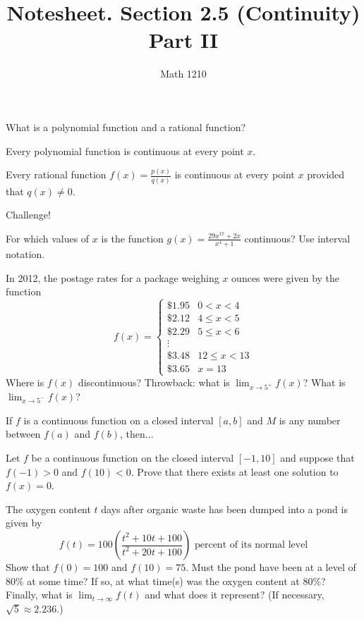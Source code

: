 \documentclass[12pt, a4paper]{article}
\author{Math 1210}
\title{Notesheet. Section 2.5 (Continuity) Part II}
\date{}
\begin{document}
\maketitle
\nameline
\begin{defi}
 What is a polynomial function and a rational function?
\end{defi}
\begin{thrm}
  \item Every polynomial function is continuous at every point $x$.
  \item Every rational function $f(x) = \frac{p(x)}{q(x)}$ is continuous at every point $x$ provided that $q(x) \neq 0$.

  \proof Challenge!
  \vs\vs\vs\vs\vs\vs\vs\vs\vs\vs\vs
\end{thrm}
\begin{ex}
  For which values of $x$ is the function $g(x) = \frac{29x^{17} + 2x}{x^4 + 1}$ continuous?  Use interval notation.
  \vspace{-0.5in}
\end{ex}
\begin{ex}
  In 2012, the postage rates for a package weighing \(x\) ounces were given by the
  function \[
    f(x) =
    \begin{cases}
      \$1.95 & 0 < x < 4 \\
      \$2.12 & 4 \leq x < 5 \\
      \$2.29 & 5 \leq x < 6 \\
      \vdots & \\
      \$3.48 & 12 \leq x < 13 \\
      \$3.65 & x = 13
    \end{cases}
  \]
  Where is \(f(x)\) discontinuous? Throwback: what is \(\lim_{x \to
    5^+} f(x)\)? What is \(\lim_{x \to 5^-} f(x)\)?
  \vspace{-1in}
\end{ex}
\begin{thrm}
  If $f$ is a continuous function on a closed interval $[a,b]$ and $M$ is any number between $f(a)$ and $f(b)$, then...
\end{thrm}
\begin{ex}
  Let $f$ be a continuous function on the closed interval $[-1,10]$
  and suppose that $f(-1) > 0$ and $f(10) < 0$.  Prove that there
  exists at least one solution to $f(x) = 0$.
  \vspace{-1in}
\end{ex}
\begin{ex}
  The oxygen content \(t\) days after organic waste has been dumped
  into a pond is given by \[
    f(t) =
      100 \left( \frac{t^2 + 10t + 100}{t^2 + 20t + 100} \right)
      \text{ percent of its normal level}
  \]
  Show that \(f(0) = 100\) and \(f(10) = 75\). Must the pond have been
  at a level of \(80\%\) at some time? If so, at what time(s) was the
  oxygen content at \(80\%\)? Finally, what is \(\lim_{t \to \infty}
  f(t)\) and what does it represent? (If necessary, \(\sqrt{5} \approx
  2.236\).)
\end{ex}
\end{document}
